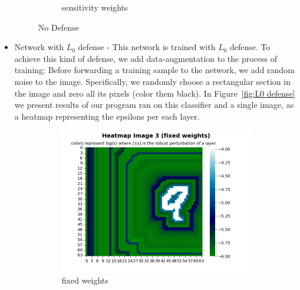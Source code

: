 \documentclass[11pt]{article}
\begin{document}
\begin{itemize}
\begin{figure}
\begin{subfigure}[b]{0.4\textwidth}
             \caption{sensitivity weights}
             \label{sub-fig:No defense SW}
         \end{subfigure}
         \caption{No Defense}
         \label{fig:No defense}
     \end{figure}
    \item Network with $L_0$ defense - This network is trained with $L_0$ defense.
    To achieve this kind of defense, we add data-augmentation to the process of training;
    Before forwarding a training sample to the network, we add random noise to the image.
    Specifically, we randomly choose a rectangular section in the image and zero all its pixels (color them black).
    In Figure~\ref{fig:L0 defense} we present results of our program ran on this classifier and a single image, as a heatmap representing the epsilons per each layer.
    \begin{figure}
         \centering
         \begin{subfigure}[b]{0.4\textwidth}
             \centering
             \includegraphics[width=\textwidth]{l0_defense_fixed_weights.png}
             \caption{fixed weights}
             \label{sub-fig:L0 defense FW}
         \end{subfigure}
         \hfill
         \begin{subfigure}[b]{0.4\textwidth}
             \centering

\end{subfigure}
\end{figure}
\end{itemize}
\end{document}
